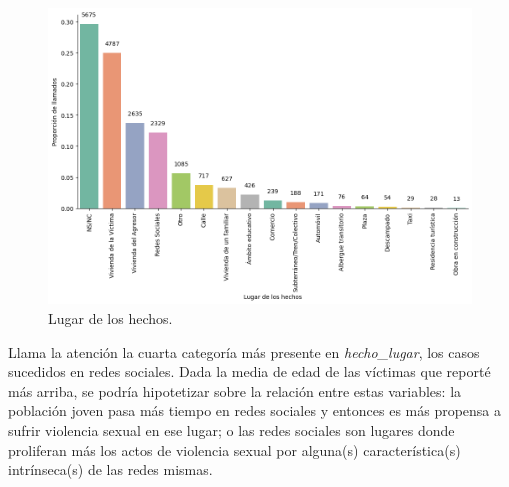 \documentclass[10 pt]{article}
\begin{document}
\begin{figure}[H]
    \begin{center}
    \includegraphics[scale=.5]{images/latex_lugar_hechos.png}
    \caption{Lugar de los hechos.}
    \label{hecholugar}
    \end{center}
    \end{figure}


Llama la atención la cuarta categoría más presente en \textit{hecho\_lugar}, los casos sucedidos en redes sociales. Dada la media de edad de las víctimas que reporté más arriba, se podría hipotetizar sobre la relación entre estas variables: la población joven pasa más tiempo en redes sociales y entonces es más propensa a sufrir violencia sexual en ese lugar; o las redes sociales son lugares donde proliferan más los actos de violencia sexual por alguna(s) característica(s) intrínseca(s) de las redes mismas. 
\end{document}
